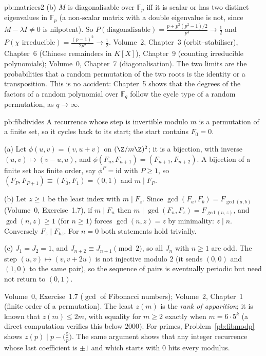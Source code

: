 \begin{solution}{pb:matrices2}
(b) $M$ is diagonalisable over $\mathbb F_p$ iff it is scalar or has two distinct eigenvalues in $\mathbb F_p$ (a non-scalar
matrix with a double eigenvalue is not, since $M-\lambda I\ne0$ is nilpotent). So
$P(\text{diagonalisable})=\frac{p+p^2(p^2-1)/2}{p^4}\to\frac12$ and $P(\chi\text{ irreducible})=\frac{(p-1)^2}{2p^2}\to\frac12$.
\tools Volume~2, Chapter~3 (orbit--stabiliser), Chapter~6 (Chinese remainders in $K[X]$), Chapter~9 (counting irreducible
polynomials); Volume~0, Chapter~7 (diagonalisation).
\leads The two limits are the probabilities that a random permutation of the two roots is the identity or a transposition.
This is no accident: Chapter~5 shows that the degrees of the factors of a random polynomial over $\mathbb F_q$ follow the cycle
type of a random permutation, as $q\to\infty$.
\end{solution}

\begin{solution}{pb:fibdivides}
\idea A recurrence whose step is invertible modulo $m$ is a permutation of a finite set, so it cycles back to its start; the start
contains $F_0=0$.

\writeup (a) Let $\phi(u,v)=(v,u+v)$ on $(\Z/m\Z)^2$; it is a bijection, with inverse $(u,v)\mapsto(v-u,u)$, and
$\phi(F_n,F_{n+1})=(F_{n+1},F_{n+2})$. A bijection of a finite set has finite order, say $\phi^P=\mathrm{id}$ with $P\ge1$, so
$(F_P,F_{P+1})\equiv(F_0,F_1)=(0,1)$ and $m\mid F_P$.

(b) Let $z\ge1$ be the least index with $m\mid F_z$. Since $\gcd(F_a,F_b)=F_{\gcd(a,b)}$ (Volume~0, Exercise~1.7), if $m\mid F_n$ then
$m\mid\gcd(F_n,F_z)=F_{\gcd(n,z)}$, and $\gcd(n,z)\ge1$ (for $n\ge1$) forces $\gcd(n,z)=z$ by minimality: $z\mid n$. Conversely $F_z\mid F_{kz}$.
For $n=0$ both statements hold trivially.

(c) $J_1=J_2=1$, and $J_{n+2}\equiv J_{n+1}\pmod2$, so all $J_n$ with $n\ge1$ are odd. The step $(u,v)\mapsto(v,v+2u)$ is not injective
modulo $2$ (it sends $(0,0)$ and $(1,0)$ to the same pair), so the sequence of pairs is eventually periodic but need not return to
$(0,1)$.

\tools Volume~0, Exercise~1.7 ($\gcd$ of Fibonacci numbers); Volume~2, Chapter~1 (finite order of a permutation).
\leads The least $z(m)$ is the \emph{rank of apparition}; it is known that $z(m)\le2m$, with equality for $m\ge2$ exactly when
$m=6\cdot5^k$ (a direct computation verifies this below $2000$). For primes, Problem~\ref{pb:fibmodp} shows $z(p)\mid p-\bigl(\frac5p\bigr)$. The same argument shows that any integer recurrence
whose last coefficient is $\pm1$ and which starts with $0$ hits every modulus.
\end{solution}

